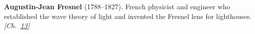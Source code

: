 \textbf{Augustin-Jean Fresnel} (1788–1827). French physicist and engineer who established the wave theory of light and invented the Fresnel lens for lighthouses. \emph{[Ch.~\hyperref[ch:poissonsspot]{13}]}

